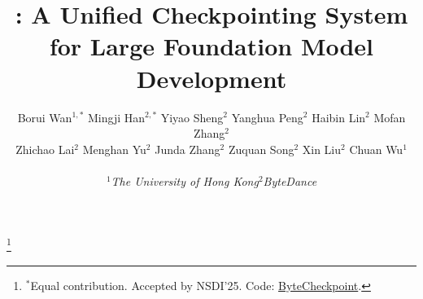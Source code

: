 \documentclass[letterpaper,twocolumn,10pt]{article}
\title{\sys{}: A Unified Checkpointing System for Large Foundation Model Development}
\begin{document}
\pagestyle{empty}
\author{
    \rm{
        Borui Wan$^{\text{1}, *}$ \enskip
        Mingji Han$^{\text{2}, *}$ \enskip
        Yiyao Sheng$^{\text{2}}$ \enskip
        Yanghua Peng$^{\text{2}}$ \enskip
        Haibin Lin$^{\text{2}}$ \enskip
        Mofan Zhang$^{\text{2}}$ \enskip
    }
    \\
    \rm{
        Zhichao Lai$^{\text{2}}$ \enskip
        Menghan Yu$^{\text{2}}$ \enskip
        Junda Zhang$^{\text{2}}$ \enskip
        Zuquan Song$^{\text{2}}$ \enskip
        Xin Liu$^{\text{2}}$ \enskip
        Chuan Wu$^{\text{1}}$ \enskip
    }
    \\
    \\
    {$^{\text{1}}$\textit{The University of Hong Kong}\enskip $^{\text{2}}$\textit{ByteDance}\enskip}
}


\maketitle
{\let\thefootnote\relax\footnote{{$^*$Equal contribution.} Accepted by NSDI'25. Code: \href{https://github.com/ByteDance-Seed/ByteCheckpoint}{ByteCheckpoint}.}}
\end{document}
